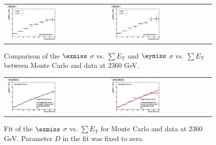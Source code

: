 \begin{figure}[h!]
 \centering
 \begin{tabular}{ll}
  \includegraphics[width=0.5\textwidth]{plots_DataVsMC_MB_2360GeV/h_metxsigma_sumet_2360.eps} &
  \includegraphics[width=0.5\textwidth]{plots_DataVsMC_MB_2360GeV/h_metysigma_sumet_2360.eps} \\
 \end{tabular}
 \caption{\small Comparison of the $\exmiss$ $\sigma$ vs. $\sum E_\text{T}$ and $\eymiss$ $\sigma$ vs. $\sum E_\text{T}$ between 
          Monte Carlo and data at $2360$ GeV.\label{fig:MExySigma_vs_SumET_2360}}
\end{figure}

\begin{figure}[h!]
 \centering
 \begin{tabular}{ll}
  \includegraphics[width=0.5\textwidth]{plots_DataVsMC_MB_2360GeV/final_metxsigma_sumet_MC_2360.eps} &
  \includegraphics[width=0.5\textwidth]{plots_DataVsMC_MB_2360GeV/final_metxsigma_sumet_DATA_2360.eps} \\
 \end{tabular}
 \caption{\small Fit of the $\exmiss$ $\sigma$ vs. $\sum E_\text{T}$ for Monte Carlo and data at $2360$ GeV. Parameter $D$ in the fit was fixed
          to zero.\label{fig:MExSigma_vs_SumET_2360_fit}}
\end{figure}

